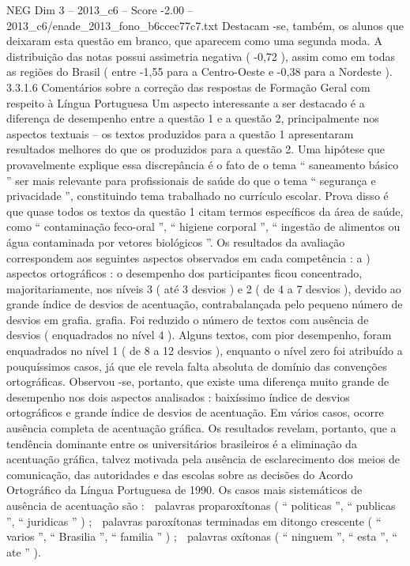 \begin{textsample}{NEG Dim 3 – 2013\_c6 – Score -2.00 – 2013\_c6/enade\_2013\_fono\_b6ccec77c7.txt}
Destacam -se, também, os alunos que deixaram esta questão em branco, que aparecem como uma segunda moda.
A distribuição das notas possui assimetria negativa ( -0,72 ), assim como em todas as regiões do Brasil ( entre -1,55 para a Centro-Oeste e -0,38 para a Nordeste ). 3.3.1.6 Comentários sobre a correção das respostas de Formação Geral com respeito à Língua Portuguesa Um aspecto interessante a ser destacado é a diferença de desempenho entre a questão 1 e a questão 2, principalmente nos aspectos textuais – os textos produzidos para a questão 1 apresentaram resultados melhores do que os produzidos para a questão 2.
Uma hipótese que provavelmente explique essa discrepância é o fato de o tema “ saneamento básico ” ser mais relevante para profissionais de saúde do que o tema “ segurança e privacidade ”, constituindo tema trabalhado no currículo escolar.
Prova disso é que quase todos os textos da questão 1 citam termos específicos da área de saúde, como “ contaminação feco-oral ”, “ higiene corporal ”, “ ingestão de alimentos ou água contaminada por vetores biológicos ”.
Os resultados da avaliação correspondem aos seguintes aspectos observados em cada competência : a ) aspectos ortográficos : o desempenho dos participantes ficou concentrado, majoritariamente, nos níveis 3 ( até 3 desvios ) e 2 ( de 4 a 7 desvios ), devido ao grande índice de desvios de acentuação, contrabalançada pelo pequeno número de desvios em grafia. grafia.
Foi reduzido o número de textos com ausência de desvios ( enquadrados no nível 4 ).
Alguns textos, com pior desempenho, foram enquadrados no nível 1 ( de 8 a 12 desvios ), enquanto o nível zero foi atribuído a pouquíssimos casos, já que ele revela falta absoluta de domínio das convenções ortográficas.
Observou -se, portanto, que existe uma diferença muito grande de desempenho nos dois aspectos analisados : baixíssimo índice de desvios ortográficos e grande índice de desvios de acentuação.
Em vários casos, ocorre ausência completa de acentuação gráfica.
Os resultados revelam, portanto, que a tendência dominante entre os universitários brasileiros é a eliminação da acentuação gráfica, talvez motivada pela ausência de esclarecimento dos meios de comunicação, das autoridades e das escolas sobre as decisões do Acordo Ortográfico da Língua Portuguesa de 1990.
Os casos mais sistemáticos de ausência de acentuação são :  palavras proparoxítonas ( “ politicas ”, “ publicas ”, “ juridicas ” ) ;  palavras paroxítonas terminadas em ditongo crescente ( “ varios ”, “ Brasilia ”, “ familia ” ) ;  palavras oxítonas ( “ ninguem ”, “ esta ”, “ ate ” ).

\end{textsample}
